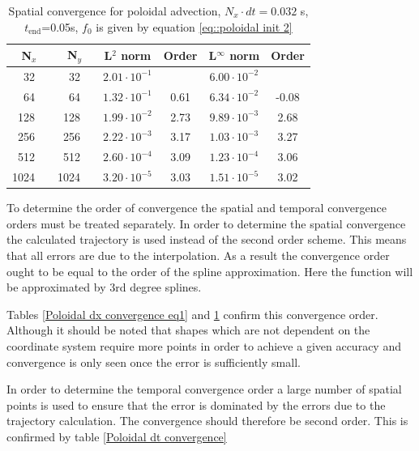 \begin{table}[ht]
\centering
 \begin{tabular}{|r c|r c|c|c|c|c|}
  \hline
  \multicolumn{2}{|c|}{\bf N$_x$} & \multicolumn{2}{|c|}{\bf N$_y$} & \bf L$^2$ norm       & \bf Order & \bf L$^\infty$ norm  & \bf Order\\
  \hline
  \hline
  32  & &  32     & & $ 2.01 \cdot 10^{ -1 }$ &       & $ 6.00 \cdot 10^{ -2 }$ &  \\
  \hline
  64  & &  64     & & $ 1.32 \cdot 10^{ -1 }$ &  0.61  & $ 6.34 \cdot 10^{ -2 }$ &  -0.08  \\
  \hline
  128  & &  128     & & $ 1.99 \cdot 10^{ -2 }$ &  2.73  & $ 9.89 \cdot 10^{ -3 }$ &  2.68  \\
  \hline
  256  & &  256     & & $ 2.22 \cdot 10^{ -3 }$ &  3.17  & $ 1.03 \cdot 10^{ -3 }$ &  3.27  \\
  \hline
  512  & &  512     & & $ 2.60 \cdot 10^{ -4 }$ &  3.09  & $ 1.23 \cdot 10^{ -4 }$ &  3.06  \\
  \hline
  1024 & & 1024     & & $ 3.20 \cdot 10^{ -5 }$ &  3.03 & $ 1.51 \cdot 10^{ -5 }$ & 3.02 \\
  \hline
 \end{tabular}
 \caption{\label{Poloidal dx convergence eq2} Spatial convergence for poloidal advection, $N_x\cdot dt = 0.032$ s, $t_{\text{end}}$=0.05s, $f_0$ is given by equation \ref{eq::poloidal init 2}}
\end{table}

To determine the order of convergence the spatial and temporal convergence orders must be treated separately. In order to  determine the spatial convergence the calculated trajectory is used instead of the second order scheme. This means that all errors are due to the interpolation. As a result the convergence order ought to be equal to the order of the spline approximation. Here the function will be approximated by 3rd degree splines.

Tables \ref{Poloidal dx convergence eq1} and \ref{Poloidal dx convergence eq2} confirm this convergence order. Although it should be noted that shapes which are not dependent on the coordinate system require more points in order to achieve a given accuracy and convergence is only seen once the error is sufficiently small.

In order to determine the temporal convergence order a large number of spatial points is used to ensure that the error is dominated by the errors due to the trajectory calculation. The convergence should therefore be second order. This is confirmed by table \ref{Poloidal dt convergence}

